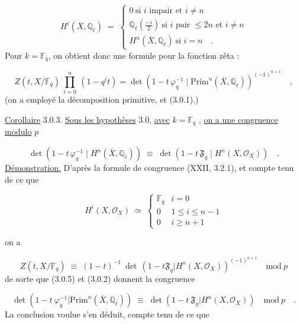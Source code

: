 \begin{equation}\tag{3.0.1}
H^i(\overline{X},\mathbb{Q}_\ell) \;=\; \left\{ \begin{array}{l} 0 \ \mbox{si $i$ impair et $i \neq n$} \\[1.5ex] \mathbb{Q}_\ell\!\left(\frac{-i}{2}\right) \ \mbox{si $i$ pair $\leq 2n$ et $i \neq n$} \\[1.5ex] H^n(\overline{X},\mathbb{Q}_\ell) \ \mbox{si $i=n$} \quad . \end{array} \right.
\end{equation}
Pour $k = \mathbb{F}_q$, on obtient donc une formule pour la fonction zêta :

\begin{equation}\tag{3.0.2}
Z(t,X/\mathbb{F}_q) \ \prod_{i=0}^{n} \ (1-q^i t) = \det(1-t\,\varphi_q^{-1} \mid \mathrm{Prim}^n(\overline{X},\mathbb{Q}_\ell))^{(-1)^{n+1}} \quad ,
\end{equation}
(on a employé la décomposition primitive, et (3.0.1).)

\underline{Corollaire} 3.0.3. \underline{Sous les hypothèses} 3.0, \underline{avec} $k = \mathbb{F}_q$ , \underline{on a une congruence modulo} $p$

\begin{equation*}
\det(1-t\,\varphi_q^{-1} \mid H^n(\overline{X},\mathbb{Q}_\ell)) \;\equiv\; \det(1-t\,\mathfrak{F}_q \mid H^n(X,\mathcal{O}_X)) \quad .
\end{equation*}
\underline{Démonstration.} D'après la formule de congruence (XXII, 3.2.1), et compte tenu de ce que

\begin{equation}\tag{3.0.4}
H^i(X,\mathcal{O}_X) \;\simeq\; \left\{ \begin{array}{ll} \mathbb{F}_q & i = 0 \\[1.5ex] 0 & 1 \leq i \leq n - 1 \\[1.5ex] 0 & i \geq n+1 \end{array} \right.
\end{equation}

on a

\begin{equation}\tag{3.0.5}
Z(t,X/\mathbb{F}_q) \;\equiv\; (1-t)^{-1}\ \det\,(1-t\mathfrak{F}_q|H^n(X,\mathcal{O}_X))^{(-1)^{n+1}} \quad \mathrm{mod}\ p
\end{equation}
de sorte que (3.0.5) et (3.0.2) donnent la congruence

\begin{equation}\tag{3.0.6}
\det(1-t\ \varphi_q^{-1}|\mathrm{Prim}^n(\overline{X},\mathbb{Q}_\ell)) \;\equiv\; \det(1-t\ \mathfrak{F}_q|H^n(X,\mathcal{O}_X)) \quad \mathrm{mod}\ p \quad .
\end{equation}
La conclusion voulue s'en déduit, compte tenu de ce que

